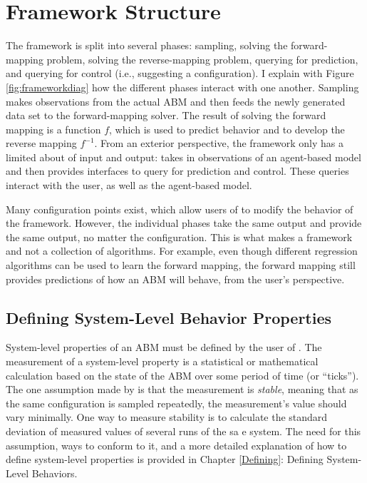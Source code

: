 \section{Framework Structure}

The framework is split into several phases: sampling, solving the forward-mapping problem, solving the reverse-mapping problem, querying for prediction, and querying for control (i.e., suggesting a configuration).
I explain with Figure \ref{fig:frameworkdiag} how the different phases interact with one another.
Sampling makes observations from the actual ABM and then feeds the newly generated data set to the forward-mapping solver.
The result of solving the forward mapping is a function $f$, which is used to predict behavior and to develop the reverse mapping $f^{-1}$.
From an exterior perspective, the framework only has a limited about of input and output:
\fw takes in observations of an agent-based model and then provides interfaces to query for prediction and control.
These queries interact with the user, as well as the agent-based model.


Many configuration points exist, which allow users of \fw to modify the behavior of the framework.
However, the individual phases take the same output and provide the same output, no matter the configuration.
This is what makes \fw a framework and not a collection of algorithms.
For example, even though different regression algorithms can be used to learn the forward mapping, the forward mapping still provides predictions of how an ABM will behave, from the user's perspective.








\subsection{Defining System-Level Behavior Properties}
System-level properties of an ABM must be defined by the user of \fw.
The measurement of a system-level property is a statistical or mathematical calculation based on the state of the ABM over some period of time (or ``ticks'').
The one assumption made by \fw is that the measurement is \textit{stable}, meaning that as the same configuration is sampled repeatedly, the measurement's value should vary minimally.
One way to measure stability is to calculate the standard deviation of measured values of several runs of the sa e system.
The need for this assumption, ways to conform to it, and a more detailed explanation of how to define system-level properties is provided in Chapter \ref{Defining}: Defining System-Level Behaviors.

